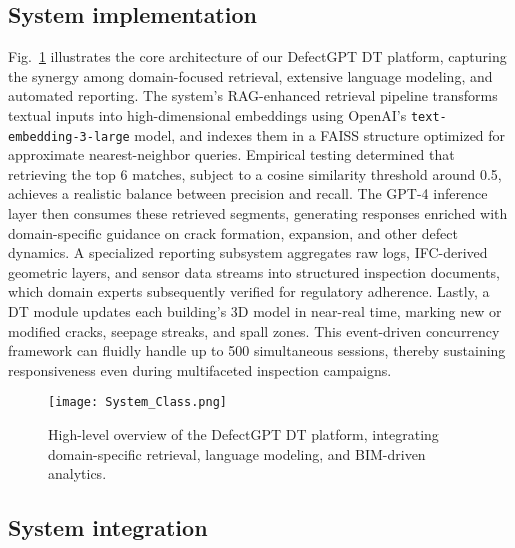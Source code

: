 \documentclass[a4paper,fleqn]{cas-sc}
\begin{document}
\subsection{System implementation}

Fig.~\ref{fig:enter-label2} illustrates the core architecture of our DefectGPT DT platform, capturing the synergy among domain-focused retrieval, extensive language modeling, and automated reporting. The system's RAG-enhanced retrieval pipeline transforms textual inputs into high-dimensional embeddings using OpenAI's \texttt{text-embedding-3-large} model, and indexes them in a FAISS structure optimized for approximate nearest-neighbor queries. Empirical testing determined that retrieving the top 6 matches, subject to a cosine similarity threshold around 0.5, achieves a realistic balance between precision and recall. The GPT-4 inference layer then consumes these retrieved segments, generating responses enriched with domain-specific guidance on crack formation, expansion, and other defect dynamics. A specialized reporting subsystem aggregates raw logs, IFC-derived geometric layers, and sensor data streams into structured inspection documents, which domain experts subsequently verified for regulatory adherence. Lastly, a DT module updates each building's 3D model in near-real time, marking new or modified cracks, seepage streaks, and spall zones. This event-driven concurrency framework can fluidly handle up to 500 simultaneous sessions, thereby sustaining responsiveness even during multifaceted inspection campaigns.



\begin{figure}[h]
    \centering
    \texttt{[image: System\_Class.png]}
    \caption{High-level overview of the DefectGPT DT platform, integrating domain-specific retrieval, language modeling, and BIM-driven analytics.}
    \label{fig:enter-label2}
\end{figure}

\subsection{System integration}
\end{document}
